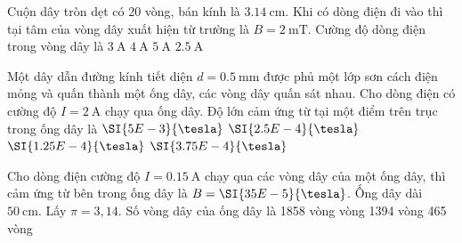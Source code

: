 \begin{ex}
	Cuộn dây tròn dẹt có 20 vòng, bán kính là $\SI{3.14}{\centi\meter}$. Khi có dòng điện đi vào thì tại tâm của vòng dây xuất hiện từ trường là $B =\SI{2}{\milli\tesla}$. Cường độ dòng điện trong vòng dây là
	\choice
	{$\SI{3}{\ampere}$}
	{$\SI{4}{\ampere}$}
	{\True $\SI{5}{\ampere}$}
	{$\SI{2.5}{\ampere}$}
\end{ex}
\begin{ex}
	Một dây dẫn đường kính tiết diện $d =\SI{0.5}{\milli\meter}$ được phủ một lớp sơn cách điện mỏng và quấn thành một ống dây, các vòng dây quấn sát nhau. Cho dòng điện có cường độ $I =\SI{2}{\ampere}$ chạy qua ống dây. Độ lớn cảm ứng từ tại một điểm trên trục trong ống dây là
	\choice
	{\True $\SI{5E-3}{\tesla}$}
	{$\SI{2.5E-4}{\tesla}$}
	{$\SI{1.25E-4}{\tesla}$}
	{$\SI{3.75E-4}{\tesla}$}
\end{ex}
\begin{ex}
	Cho dòng điện cường độ $I = \SI{0.15}{\ampere}$ chạy qua các vòng dây của một ống dây, thì cảm ứng từ bên trong ống dây là $B =\SI{35E-5}{\tesla}$. Ống dây dài $\SI{50}{\centi\meter}$. Lấy $\pi=3,14$. Số vòng dây của ống dây là
	\choice
	{1858 vòng}
	{ vòng}
	{1394 vòng}
	{465 vòng}
\end{ex}

